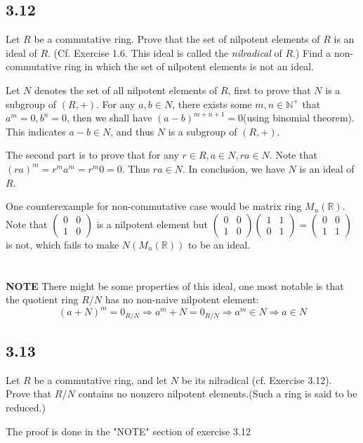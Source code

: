 \documentclass[a4paper, pdf, 12pt]{article}
\makeatletter
\renewenvironment{proof}[1][\proofname]{\par
  \pushQED{\qed}%
  \normalfont \topsep6\p@\@plus6\p@\relax
  \trivlist
  \item[%
    \hskip\labelsep
    \normalfont\bfseries %
    #1%
    \@addpunct{.}%
  ]\ignorespaces
}{%
  \popQED\endtrivlist\@endpefalse
}
\let\qed\relax %
\DeclareRobustCommand{\qed}{%
  \ifmmode \mathqed
  \else
    \leavevmode\unskip\penalty\@M\hbox{}\nobreak\hspace{.5em minus .1em}%
    \hbox{\qedsymbol}%
  \fi
}
\makeatother
\begin{document}
\subsection*{3.12}
Let $R$ be a commutative ring. Prove that the set of nilpotent elements of $R$ is an ideal of $R$. 
(Cf. Exercise 1.6. This ideal is called the \textit{nilradical} of $R$.)
Find a non-commutative ring in which the set of nilpotent elements is not an ideal.
\begin{proof}
  Let $N$ denotes the set of all nilpotent elements of $R$, first to prove that 
  $N$ is a subgroup of $(R, +)$. For any $a, b\in N$, there exists some $m,n\in \mathbb{N}^{+}$
  that $a^{m} = 0, b^{n} = 0$, then we shall have $(a-b)^{m+n+1} = 0$(using binomial theorem). This
  indicates $a-b\in N$, and thus $N$ is a subgroup of $(R, +)$.

  The second part is to prove that for any $r\in R, a\in N, ra\in N$. Note that $(ra)^{m} = r^{m}a^{m} = r^{m}0=0$.
  Thus $ra\in N$. In conclusion, we have $N$ is an ideal of $R$.

  One counterexample for non-commutative case would be matrix ring $M_{n}(\mathbb{R})$. Note that 
  $\begin{pmatrix}
    0 & 0\\
    1 & 0
  \end{pmatrix}$ is a nilpotent element but 
  $\begin{pmatrix}
    0 & 0\\
    1 & 0
  \end{pmatrix}
  \begin{pmatrix}
    1 & 1\\
    0 & 1
  \end{pmatrix}=
  \begin{pmatrix}
    0 & 0\\
    1 & 1
  \end{pmatrix}
  $ is not, which fails to make $N(M_{n}(\mathbb{R}))$ to be 
  an ideal.\\
  \\
  \\
  \noindent
  \textbf{NOTE} There might be some properties of this ideal, one most notable is that the 
  quotient ring $R/N$ has no non-naive nilpotent element:
  $$
  (a+N)^{m} = 0_{R/N}\Rightarrow a^{m} + N = 0_{R/N}\Rightarrow a^{m}\in N\Rightarrow a\in N
  $$
\end{proof}
\subsection*{3.13}
Let $R$ be a commutative ring, and let $N$ be its nilradical (cf. Exercise 3.12). 
Prove that $R/N$ contains no nonzero nilpotent elements.(Such a ring is said to be reduced.)
\begin{proof}
  The proof is done in the "NOTE" section of exercise 3.12
\end{proof}
\end{document}
